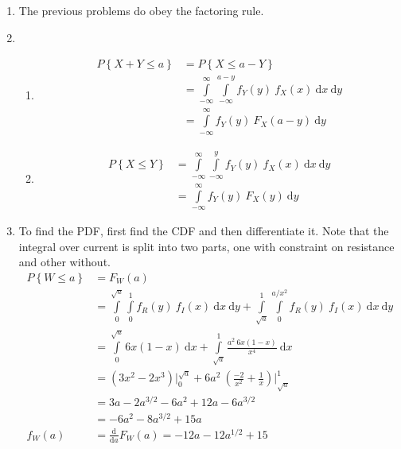 \begin{enumerate}
	
	\item The previous problems do obey the factoring rule. \\
	
	\item 
		\begin{enumerate}
			\item \begin{align}
				P \left\{X + Y \leq a \right\} &= P \left\{ X \leq a - Y \right\} \nonumber \\
				&= \int\limits_{-\infty}^{\infty} \int\limits_{-\infty}^{a - y} f_Y (y) \ f_X(x) \ \mathrm{d}x \ \mathrm{d}y  \nonumber \\
				&= \int\limits_{-\infty}^{\infty} f_Y (y) \ F_X(a - y) \ \mathrm{d}y 
			\end{align}
			
			\item \begin{align}
				P \left\{ X \leq Y \right\} &= \int\limits_{-\infty}^{\infty} \int\limits_{-\infty}^{y} f_Y (y) \ f_X(x) \ \mathrm{d}x \ \mathrm{d}y  \nonumber \\
				&= \int\limits_{-\infty}^{\infty} f_Y (y) \ F_X(y) \ \mathrm{d}y 
			\end{align}
		\end{enumerate}
	
	
	\item To find the PDF, first find the CDF and then differentiate it. Note that the integral over current is split into two parts, one with constraint on resistance and other without. \\
	
		\begin{align}
			P \left\{ W \leq a \right\} &= F_W (a) \nonumber \\
			&= \int\limits_{0}^{\sqrt{a}} \int\limits_{0}^{1}  f_R (y) \ f_I(x) \ \mathrm{d}x \ \mathrm{d}y  + \int\limits_{\sqrt{a}}^{1} \int\limits_{0}^{a/x^2}  f_R (y) \ f_I(x) \ \mathrm{d}x \ \mathrm{d}y \nonumber \\
			&= \int\limits_{0}^{\sqrt{a}}  6x(1-x) \ \mathrm{d}x + \int\limits_{\sqrt{a}}^{1} \frac{a^2\ 6x(1-x)}{x^4} \ \mathrm{d}x \nonumber \\
			&= \left(3x^2 - 2x^3\right) \Big|_0^{\sqrt{a}} + 6a^2\ \left(\frac{-2}{x^2} + \frac{1}{x}\right)\Big|_{\sqrt{a}}^{1} \nonumber \\
			&= 3a - 2a^{3/2} - 6a^2 + 12a -6a^{3/2} \nonumber \\
			&= - 6a^2 - 8a^{3/2} + 15a \\
			f_W (a) &= \frac{\mathrm{d}}{\mathrm{d} a} F_W (a) = -12a - 12a^{1/2} + 15
		\end{align} \\
	

\end{enumerate}
